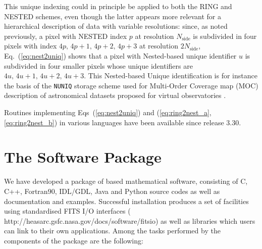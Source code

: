 \documentclass[12pt,twoside]{article}
\newcommand{\nside}{N_{\mathrm{side}}}
\begin{document}
This unique indexing could in principle be applied to both the RING and NESTED schemes, 
even though the latter appears more relevant for a hierarchical description 
of data with variable resolutions: since, as noted previously, a pixel with NESTED index $p$ 
at resolution $\nside$ is subdivided in four pixels with index $4p,\, 4p+1,\, 4p+2,\, 4p+3$ 
at resolution $2\nside$, Eq.~(\ref{eq:nest2uniq}) shows that
a pixel with Nested-based unique identifier $u$ is subdivided in four smaller pixels 
whose unique identifiers are $4u,\, 4u+1,\, 4u+2,\, 4u+3$.
This Nested-based Unique identification is for instance the basis of the \texttt{NUNIQ} storage scheme used for Multi-Order Coverage map (MOC) description of astronomical datasets proposed for virtual observatories \citep{moc}.

Routines implementing Eqs~(\ref{eq:nest2uniq}) and (\ref{eq:ring2nest_a}, \ref{eq:ring2nest_b}) in various languages have been available since release 3.30.


\section{The \healpix Software Package}

We have developed a package of \healpix based mathematical software, consisting
of C, C++, Fortran90, IDL/GDL, Java and Python source codes as well as documentation and
examples. Successful installation produces a set of facilities using standardised
FITS I/O interfaces 
(
{http://heasarc.gsfc.nasa.gov/docs/software/fitsio}) 
as well as 
libraries  which users can link to their own applications.
Among the tasks performed by the  components of the 
\healpix package  are the
following:
\end{document}
